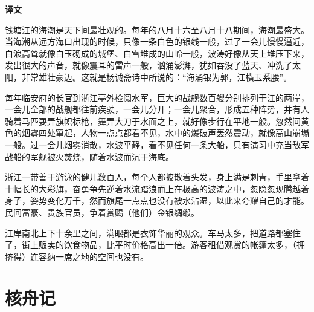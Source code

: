 \documentclass[12pt,UTF-8,openany,a4]{ctexbook}
\begin{document}
\newpage

\begin{Large}
    \noindent\textbf{译文}
\end{Large}


\vspace{1em}

\begin{large}
    \yiwen 
    钱塘江的海潮是天下间最壮观的。每年的八月十六至八月十八期间，海潮最盛大。当海潮从远方海口出现的时候，只像一条白色的银线一般，过了一会儿慢慢逼近，白浪高耸就像白玉砌成的城堡、白雪堆成的山岭一般，波涛好像从天上堆压下来，发出很大的声音，就像震耳的雷声一般，汹涌澎湃，犹如吞没了蓝天、冲洗了太阳，非常雄壮豪迈。这就是杨诚斋诗中所说的：“海涌银为郭，江横玉系腰”。
    
    每年临安府的长官到浙江亭外检阅水军，巨大的战舰数百艘分别排列于江的两岸，一会儿全部的战舰都往前疾驶，一会儿分开；一会儿聚合，形成五种阵势，并有人骑着马匹耍弄旗帜标枪，舞弄大刀于水面之上，就好像步行在平地一般。忽然间黄色的烟雾四处窜起，人物一点点都看不见，水中的爆破声轰然震动，就像高山崩塌一般。过一会儿烟雾消散，水波平静，看不见任何一条大船，只有演习中充当敌军战船的军舰被火焚烧，随着水波而沉于海底。
    
    浙江一带善于游泳的健儿数百人，每个人都披散着头发，身上满是刺青，手里拿着十幅长的大彩旗，奋勇争先逆着水流踏浪而上在极高的波涛之中，忽隐忽现腾越着身子，姿势变化万千，然而旗尾一点点也没有被水沾湿，以此来夸耀自己的才能。民间富豪、贵族官员，争着赏赐（他们）金银绸缎。
    
    江岸南北上下十余里之间，满眼都是衣饰华丽的观众。车马太多，把道路都塞住了，街上贩卖的饮食物品，比平时价格高出一倍。游客租借观赏的帐篷太多，（拥挤得）连容纳一席之地的空间也没有。
    
\end{large}



\chapter{核舟记}
\end{document}
